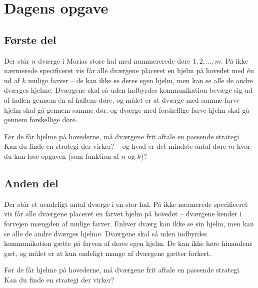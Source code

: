 \begin{minipage}[t]{100mm}
\vspace{3mm}
\section*{Dagens opgave}
\subsection*{Første del}
Der står $n$ dværge i Morias store hal med nummererede døre $1,2,\dotsc,m$. På ikke nærmerede specificeret vis får alle dværgene placeret en hjelm på hovedet med én ud af $k$ mulige farver -- de kan ikke se deres egen hjelm, men kan se alle de andre dværges hjelme. Dværgene skal så uden indbyrdes kommunikation bevæge sig ud af hallen gennem én af hallens døre, og målet er at dværge med samme farve hjelm skal gå gennem samme dør, og dværge med forskellige farve hjelm skal gå gennem forskellige døre.
 
Før de får hjelme på hovederne, må dværgene frit aftale en passende strategi. Kan du finde en strategi der virker? -- og hvad er det mindste antal døre $m$ hvor du kan løse opgaven (som funktion af $n$ og $k$)?
 
\subsection*{Anden del}
Der står et uendeligt antal dværge i en stor hal. På ikke nærmerede specificeret vis får alle dværgene placeret en farvet hjelm på hovedet -- dværgene kender i forvejen mængden af mulige farver. Enhver dværg kan ikke se sin hjelm, men kan se alle de andre dværges hjelme. Dværgene skal så uden indbyrdes kommunikation gætte på farven af deres egen hjelm. De kan ikke høre hinandens gæt, og målet er at kun endeligt mange af dværgene gætter forkert.
 
Før de får hjelme på hovederne, må dværgene frit aftale en passende strategi. Kan du finde en strategi der virker?
\end{minipage}
